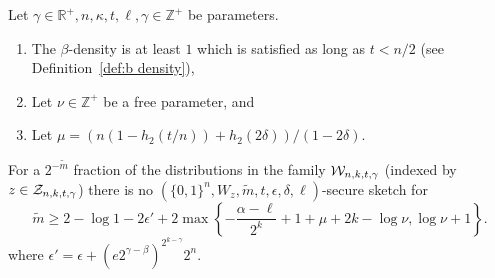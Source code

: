 \begin{theorem}
Let $\gamma \in\mathbb{R}^+, n, \kappa, t, \ell, \gamma \in\mathbb{Z}^+$ be parameters.
\begin{enumerate}
\itemsep0em
\item The $\beta$-density is at least $1$ which is  satisfied as long as $t< n/2 $ (see Definition~\ref{def:b density}),
\item Let $\nu \in \mathbb{Z}^+$ be a free parameter, and
\item Let $\mu =(n(1-h_2(t/n)) +h_2(2\delta))/(1-2\delta)$.
\end{enumerate}
For a $2^{-\tilde{m}}$ fraction of the distributions in the family $\mathcal{W}_{n,k,t,\gamma}$ (indexed by $z\in\mathcal{Z}_{n,k,t,\gamma}$) there is no $(\{0,1\}^n, W_z, \tilde{m}, t, \epsilon,\delta, \ell)$-secure sketch for 
\[
\tilde{m}\ge  2-\log{1-2\epsilon'}  + 2\max\left\{-\frac{\alpha-\ell}{2^k}+1+\mu+2k-\log{\nu}, \log{\nu+1}\right\}.
\]
where $\epsilon' = \epsilon+\left(e2^{\gamma-\beta}\right)^{2^{k-\gamma}}2^n.$
\label{thm:main theorem ss}
\end{theorem}

